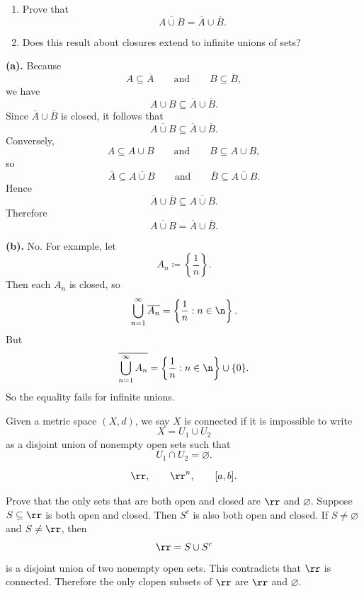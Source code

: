 \begin{problem}{
    \begin{enumerate}[label={(\alph*)}]
	\item Prove that
    \[
        \overline{A\cup B}=\overline{A}\cup\overline{B}.
    \]
    \item Does this result about closures extend to infinite unions of sets?
    \end{enumerate}
}
    \textbf{(a).}
    Because
    \[
        A\subseteq \overline{A}
        \qquad\text{and}\qquad
        B\subseteq \overline{B},
    \]
    we have
    \[
        A\cup B\subseteq \overline{A}\cup\overline{B}.
    \]
    Since $\overline{A}\cup\overline{B}$ is closed, it follows that
    \[
        \overline{A\cup B}\subseteq \overline{A}\cup\overline{B}.
    \]
    Conversely,
    \[
        A\subseteq A\cup B
        \qquad\text{and}\qquad
        B\subseteq A\cup B,
    \]
    so
    \[
        \overline{A}\subseteq \overline{A\cup B}
        \qquad\text{and}\qquad
        \overline{B}\subseteq \overline{A\cup B}.
    \]
    Hence
    \[
        \overline{A}\cup\overline{B}\subseteq \overline{A\cup B}.
    \]
    Therefore
    \[
        \overline{A\cup B}=\overline{A}\cup\overline{B}.
    \]

    \textbf{(b).}
    No.
    For example, let
    \[
        A_n \coloneqq \left\{\frac1n\right\}.
    \]
    Then each $A_n$ is closed, so
    \[
        \bigcup_{n=1}^\infty \overline{A_n}
        =
        \left\{\frac1n : n\in\n\right\}.
    \]
    But
    \[
        \overline{\bigcup_{n=1}^\infty A_n}
        =
        \left\{\frac1n : n\in\n\right\}\cup\{0\}.
    \]
    So the equality fails for infinite unions.
\end{problem}

\begin{definition}[Connectedness]
    Given a metric space $(X,d)$, we say $X$ is connected if it is impossible to write
    \[
        X = U_1\cup U_2
    \]
    as a disjoint union of nonempty open sets such that
    \[
        U_1\cap U_2 = \varnothing.
    \]
\end{definition}

\begin{example}
    \[
        \rr,\qquad \rr^n,\qquad [a,b].
    \]
\end{example}

\begin{problem}{
    Prove that the only sets that are both open and closed are $\rr$ and $\varnothing$.
}
    Suppose $S\subseteq \rr$ is both open and closed.
    Then $S^c$ is also both open and closed.
    If $S\neq \varnothing$ and $S\neq \rr$, then
    \[
        \rr = S\cup S^c
    \]
    is a disjoint union of two nonempty open sets.
    This contradicts that $\rr$ is connected.
    Therefore the only clopen subsets of $\rr$ are $\rr$ and $\varnothing$.
\end{problem}

